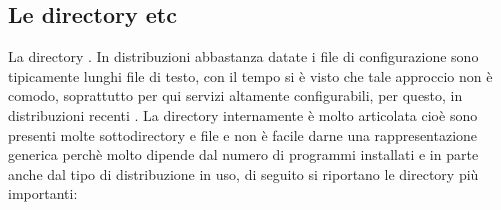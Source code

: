 \subsection{Le directory etc}
\label{subsec:Le-directory-etc}
La directory  . In distribuzioni abbastanza datate i file di configurazione sono tipicamente lunghi file di testo, con il tempo si è visto che tale approccio non è comodo, soprattutto per qui servizi altamente configurabili, per questo, in distribuzioni recenti . La directory internamente è molto articolata cioè sono presenti molte sottodirectory e file e non è facile darne una rappresentazione generica perchè molto dipende dal numero di programmi installati e in parte anche dal tipo di distribuzione in uso, di seguito si riportano le directory più importanti:
